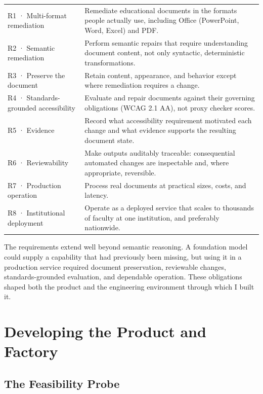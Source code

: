 {\begin{longtable}[]{@{}
  >{\raggedright\arraybackslash}p{}
  >{\raggedright\arraybackslash}p{}@{}}
R1 · Multi-format remediation & Remediate educational documents in the formats people actually use, including Office (PowerPoint, Word, Excel) and PDF. \\
R2 · Semantic remediation & Perform semantic repairs that require understanding document content, not only syntactic, deterministic transformations. \\
R3 · Preserve the document & Retain content, appearance, and behavior except where remediation requires a change. \\
R4 · Standards-grounded accessibility & Evaluate and repair documents against their governing obligations (WCAG 2.1 AA), not proxy checker scores. \\
R5 · Evidence & Record what accessibility requirement motivated each change and what evidence supports the resulting document state. \\
R6 · Reviewability & Make outputs auditably traceable: consequential automated changes are inspectable and, where appropriate, reversible. \\
R7 · Production operation & Process real documents at practical sizes, costs, and latency. \\
R8 · Institutional deployment & Operate as a deployed service that scales to thousands of faculty at one institution, and preferably nationwide. \\
\end{longtable}
}


The requirements extend well beyond semantic reasoning. A foundation model could supply a capability that had previously been missing, but using it in a production service required document preservation, reviewable changes, standards-grounded evaluation, and dependable operation. These obligations shaped both the product and the engineering environment through which I built it.

\section{Developing the Product and Factory}\label{heading:building-the-factory}

\subsection{The Feasibility Probe}\label{heading:the-feasibility-probe}

